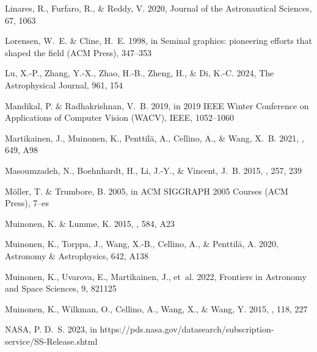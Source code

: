 \begin{thebibliography}{74}
{Linares}, R., {Furfaro}, R., \& {Reddy}, V. 2020, Journal of the Astronautical Sciences, 67, 1063

Lorensen, W.~E. \& Cline, H.~E. 1998, in Seminal graphics: pioneering efforts that shaped the field (ACM Press), 347--353

Lu, X.-P., Zhang, Y.-X., Zhao, H.-B., Zheng, H., \& Di, K.-C. 2024, The Astrophysical Journal, 961, 154

Mandikal, P. \& Radhakrishnan, V.~B. 2019, in 2019 IEEE Winter Conference on Applications of Computer Vision (WACV), IEEE, 1052--1060

{Martikainen}, J., {Muinonen}, K., {Penttil{\"a}}, A., {Cellino}, A., \& {Wang}, X.~B. 2021, \aap, 649, A98

{Masoumzadeh}, N., {Boehnhardt}, H., {Li}, J.-Y., \& {Vincent}, J.~B. 2015, \icarus, 257, 239

M{\"o}ller, T. \& Trumbore, B. 2005, in ACM SIGGRAPH 2005 Courses (ACM Press), 7--es

{Muinonen}, K. \& {Lumme}, K. 2015, \aap, 584, A23

Muinonen, K., Torppa, J., Wang, X.-B., Cellino, A., \& Penttil{\"a}, A. 2020, Astronomy \& Astrophysics, 642, A138

{Muinonen}, K., {Uvarova}, E., {Martikainen}, J., {et~al.} 2022, Frontiers in Astronomy and Space Sciences, 9, 821125

{Muinonen}, K., {Wilkman}, O., {Cellino}, A., {Wang}, X., \& {Wang}, Y. 2015, \planss, 118, 227

NASA, P. D.~S. 2023, in https://pds.nasa.gov/datasearch/subscription-service/SS-Release.shtml


\end{thebibliography}
